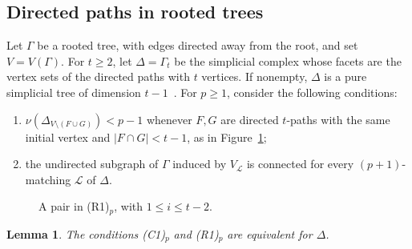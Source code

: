 \documentclass{amsart}
\newtheorem{Lemma}[Theorem]{Lemma}
\theoremstyle{definition}
\theoremstyle{remark}
\begin{document}

\subsection{Directed paths in rooted trees}\label{subsec:rooted-trees}

Let $\Gamma$ be a rooted tree, with edges directed away from the root,
and set $V=V(\Gamma)$.
For $t\geq2$, let $\Delta=\Gamma_t$ be the simplicial complex whose
facets are the vertex sets of the directed paths with $t$ vertices.
If nonempty, $\Delta$ is a pure simplicial tree of dimension
$t-1$~\cite[Theorem~2.7]{JV}.
For $p\geq1$, consider the following conditions:

\begin{enumerate}
\item[\textnormal{(R1)$_p$}] $\nu(\Delta_{V\setminus(F\cup G)})<p-1$ whenever $F,G$ are directed $t$-paths with the same initial vertex and $|F\cap G|<t-1$, as in Figure~\ref{fig:rooted-branch};
\item[\textnormal{(R2)$_p$}] the undirected subgraph of $\Gamma$ induced by $V_{\mathcal L}$ is connected for every $(p+1)$-matching $\mathcal L$ of $\Delta$.
\end{enumerate}

\begin{figure}[ht]
\centering
{}
\caption{A pair in \textnormal{(R1)$_p$}, with $1\leq i\leq t-2$.}
\label{fig:rooted-branch}
\end{figure}



\begin{Lemma}\label{lem:rooted-C1}
The conditions \textnormal{(C1)$_p$} and \textnormal{(R1)$_p$} are equivalent for $\Delta$.
\end{Lemma}
\end{document}

